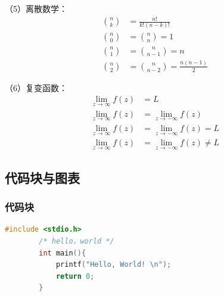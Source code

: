 \begin{ujnbody}
    （5）离散数学：
    \begin{equation}
        \begin{split}
            \binom{n}{k} &= \frac{n!}{k!(n-k)!} \\
            \binom{n}{0} &= \binom{n}{n} = 1 \\
            \binom{n}{1} &= \binom{n}{n-1} = n \\
            \binom{n}{2} &= \binom{n}{n-2} = \frac{n(n-1)}{2}
        \end{split}
    \end{equation}

    （6）复变函数：
    \begin{equation}
        \begin{split}
            \lim_{z \to \infty}f(z) &= L \\
            \lim_{z \to \infty}f(z) &= \lim_{z \to -\infty}f(z) \\
            \lim_{z \to \infty}f(z) &= \lim_{z \to -\infty}f(z) = L \\
            \lim_{z \to \infty}f(z) &= \lim_{z \to -\infty}f(z) \neq L
        \end{split}
    \end{equation}
    \subsection{代码块与图表}
    \subsubsection{代码块}
    \begin{lstlisting}[language=C]
        #include <stdio.h>
        /* hello，world */
        int main(){
            printf("Hello, World! \n"); 
            return 0;
        }
    \end{lstlisting}

\end{ujnbody}
